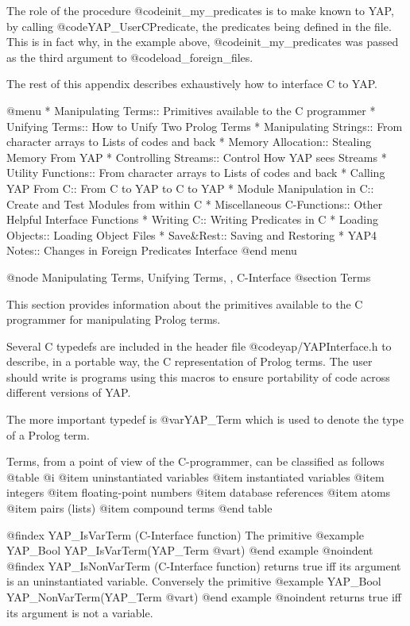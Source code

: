 {{{{{{{{{The role of the procedure @code{init_my_predicates} is to make known to
YAP, by calling @code{YAP_UserCPredicate}, the predicates being
defined in the file.  This is in fact why, in the example above,
@code{init_my_predicates} was passed as the third argument to
@code{load_foreign_files}.

The rest of this appendix describes exhaustively how to interface C to YAP.

@menu
* Manipulating Terms:: Primitives available to the C programmer
* Unifying Terms:: How to Unify Two Prolog Terms
* Manipulating Strings:: From character arrays to Lists of codes and back
* Memory Allocation:: Stealing Memory From YAP
* Controlling Streams:: Control How YAP sees Streams
* Utility Functions:: From character arrays to Lists of codes and back
* Calling YAP From C:: From C to YAP to C to YAP 
* Module Manipulation in C:: Create and Test Modules from within C
* Miscellaneous C-Functions:: Other Helpful Interface Functions
* Writing C:: Writing Predicates in C
* Loading Objects:: Loading Object Files
* Save&Rest:: Saving and Restoring
* YAP4 Notes:: Changes in Foreign Predicates Interface
@end menu

@node Manipulating Terms, Unifying Terms, , C-Interface
@section Terms

This section provides information about the primitives available to the C
programmer for manipulating Prolog terms.

Several C typedefs are included in the header file @code{yap/YAPInterface.h} to
describe, in a portable way, the C representation of Prolog terms.
The user should write is programs using this macros to ensure portability of
code across different versions of YAP.


The more important typedef is @var{YAP_Term} which is used to denote the
type of a Prolog term.

Terms, from a point of view of the C-programmer,  can be classified as
follows
@table @i
@item    uninstantiated variables
@item    instantiated variables
@item    integers
@item    floating-point numbers
@item    database references
@item    atoms
@item    pairs (lists)
@item    compound terms
@end table

@findex YAP_IsVarTerm (C-Interface function)
The primitive
@example
     YAP_Bool YAP_IsVarTerm(YAP_Term @var{t})
@end example
@noindent
@findex YAP_IsNonVarTerm (C-Interface function)
returns true iff its argument is an uninstantiated variable. Conversely the
primitive
@example
      YAP_Bool YAP_NonVarTerm(YAP_Term @var{t})
@end example
@noindent
returns true iff its argument is not a variable.


}}}}}}}}}
